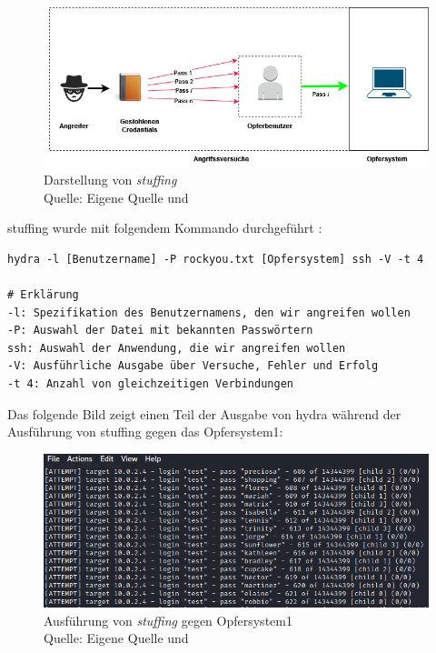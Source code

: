 \begin{figure}[H]
   \centering
   \includegraphics[width=1\textwidth]{assets/Stuffing.jpg}
   \caption[Darstellung von \textit{\gls{stuffing}}]
   {Darstellung von \textit{\gls{stuffing}}\\Quelle: Eigene Quelle und \citep{Nguyen_stuffing}}
   \centering
\end{figure}

\gls{stuffing} wurde mit folgendem Kommando durchgeführt \citep{kali_hydra}:
{
\begin{Verbatim}[frame=single]
hydra -l [Benutzername] -P rockyou.txt [Opfersystem] ssh -V -t 4

# Erklärung
-l: Spezifikation des Benutzernamens, den wir angreifen wollen
-P: Auswahl der Datei mit bekannten Passwörtern
ssh: Auswahl der Anwendung, die wir angreifen wollen
-V: Ausführliche Ausgabe über Versuche, Fehler und Erfolg
-t 4: Anzahl von gleichzeitigen Verbindungen
\end{Verbatim}
}

\newpage
Das folgende Bild zeigt einen Teil der Ausgabe von \gls{hydra} während der Ausführung von \gls{stuffing} gegen das Opfersystem1:
\begin{figure}[H]
   \centering
   \includegraphics[width=1\textwidth]{assets/stuffing_kali.png}
   \caption[Ausführung von \textit{\gls{stuffing}} gegen Opfersystem1]
   {Ausführung von \textit{\gls{stuffing}} gegen Opfersystem1\\Quelle: Eigene Quelle und \citep{Nguyen_stuffing}}
   \centering
\end{figure}


